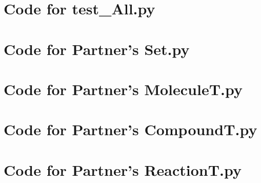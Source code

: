 \documentclass[12pt]{article}
\begin{document}
\newpage

\section{Code for test\_All.py}

\noindent 

\newpage

\section{Code for Partner's Set.py}

\noindent 

\newpage

\section{Code for Partner's MoleculeT.py}

\noindent 

\newpage

\section{Code for Partner's CompoundT.py}

\noindent 

\newpage

\section{Code for Partner's ReactionT.py}

\noindent 
\end{document}
